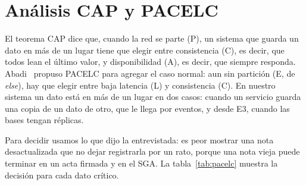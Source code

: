 \section{Análisis CAP y PACELC}
\label{sec:cap-pacelc}

El teorema CAP dice que, cuando la red se parte (P), un sistema que guarda un dato en más de un lugar tiene que elegir entre consistencia (C), es decir, que todos lean el último valor, y disponibilidad (A), es decir, que siempre responda. Abadi~\cite{Abadi2012} propuso PACELC para agregar el caso normal: aun sin partición (E, de \emph{else}), hay que elegir entre baja latencia (L) y consistencia (C). En nuestro sistema un dato está en más de un lugar en dos casos: cuando un servicio guarda una copia de un dato de otro, que le llega por eventos, y desde E3, cuando las bases tengan réplicas.

Para decidir usamos lo que dijo la entrevistada: es peor mostrar una nota desactualizada que no dejar registrarla por un rato, porque una nota vieja puede terminar en un acta firmada y en el SGA. La tabla~\ref{tab:pacelc} muestra la decisión para cada dato crítico.

